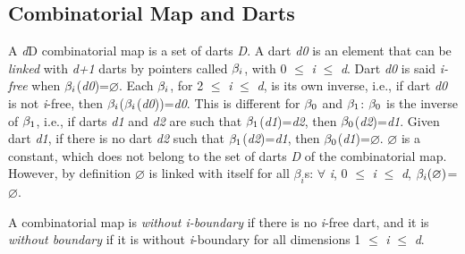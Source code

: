 \subsection{Combinatorial Map and Darts}\label{ssec-combi-map-and-darts}
A \emph{d}D combinatorial map is a set of darts \emph{D}. A dart \emph{d0} is an
element that can be \emph{linked} with \emph{d+1} darts by pointers called
$\beta_{i}$, with 0 $\leq$ \emph{i} $\leq$ \emph{d}.  Dart \emph{d0} is said \emph{i-free}
when $\beta_{i}$(\emph{d0})=$\varnothing$.  Each $\beta_{i}$, for 2 $\leq$ \emph{i} $\leq$ \emph{d},
is its own inverse, i.e., if dart \emph{d0} is not \emph{i}-free, then
$\beta_{i}$($\beta_{i}$(\emph{d0}))=\emph{d0}.  This is different for $\beta_{0}$ and
$\beta_{1}$: $\beta_{0}$ is the inverse of $\beta_{1}$, i.e., if darts \emph{d1}
and \emph{d2} are such that $\beta_{1}$(\emph{d1})=\emph{d2}, then
$\beta_{0}$(\emph{d2})=\emph{d1}. Given dart \emph{d1}, if there is no dart \emph{d2} such
that $\beta_{1}$(\emph{d2})=\emph{d1}, then $\beta_{0}$(\emph{d1})=$\varnothing$.  $\varnothing$
is a constant, which does not belong to the set of darts \emph{D} of the
combinatorial map. However, by definition $\varnothing$ is linked with
itself for all $\beta_i$s: $\forall$ \emph{i}, 0 $\leq$ \emph{i} $\leq$ \emph{d},
$\beta_{i}(\varnothing)$=$\varnothing$.




A combinatorial map is \emph{without i-boundary} if there is no
\emph{i}-free dart, and it is \emph{without boundary} if it is without
\emph{i}-boundary for all dimensions 1 $\leq$ \emph{i} $\leq$ \emph{d}.


